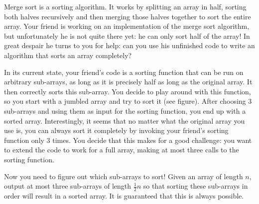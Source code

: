 

\providecommand\maxn{}
\renewcommand{\maxn}{10^5}

Merge sort is a sorting algorithm. It works by splitting an array in half, sorting both halves recursively and then merging those halves together to sort the entire array. Your friend is working on an implementation of the merge sort algorithm, but unfortunately he is not quite there yet: he can only sort half of the array! In great despair he turns to you for help: can you use his unfinished code to write an algorithm that sorts an array completely?

In its current state, your friend's code is a sorting function that can be run on arbitrary sub-arrays, as long
as it is precisely half as long as the original array. It then correctly sorts this sub-array. You decide to
play around with this function, so you start with a jumbled array and try to sort it (see figure).
After choosing $3$ sub-arrays and using them as input for the sorting function, you end
up with a sorted array. Interestingly, it seems that no matter what the original array you use is, you can always sort it completely by invoking your friend's sorting function only $3$ times. You decide that this makes for a good challenge: you want to extend the code to work for a full array, making at most three calls to the sorting function.

Now you need to figure out which sub-arrays to sort!
Given an array of length $n$, output at most three sub-arrays of length $\tfrac{1}{2}n$
so that sorting these sub-arrays in order will result in a sorted array.
It is guaranteed that this is always possible.

